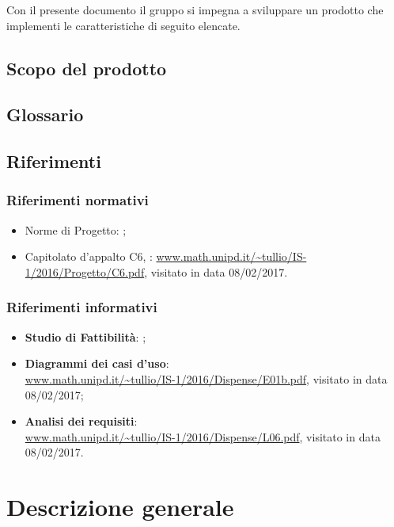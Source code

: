 Con il presente documento il gruppo \hx{} si impegna a sviluppare un prodotto che implementi le caratteristiche di seguito elencate.

\subsection{Scopo del prodotto}
\scopo

\subsection{Glossario}
\presgloss

\subsection{Riferimenti}
\subsubsection{Riferimenti normativi}
\begin{itemize}
	\item Norme di Progetto: \NdP;
	\item Capitolato d'appalto C6, \proj: \url{www.math.unipd.it/~tullio/IS-1/2016/Progetto/C6.pdf}, visitato in data 08/02/2017.
\end{itemize}

\subsubsection{Riferimenti informativi}
\begin{itemize}
	\item \textbf{Studio di Fattibilità}: \SdF;
	\item \textbf{Diagrammi dei casi d'uso}: \\
	\url{www.math.unipd.it/~tullio/IS-1/2016/Dispense/E01b.pdf}, visitato in data 08/02/2017;
	\item \textbf{Analisi dei requisiti}: \\
	\url{www.math.unipd.it/~tullio/IS-1/2016/Dispense/L06.pdf}, visitato in data 08/02/2017.
\end{itemize}






\section{Descrizione generale}

